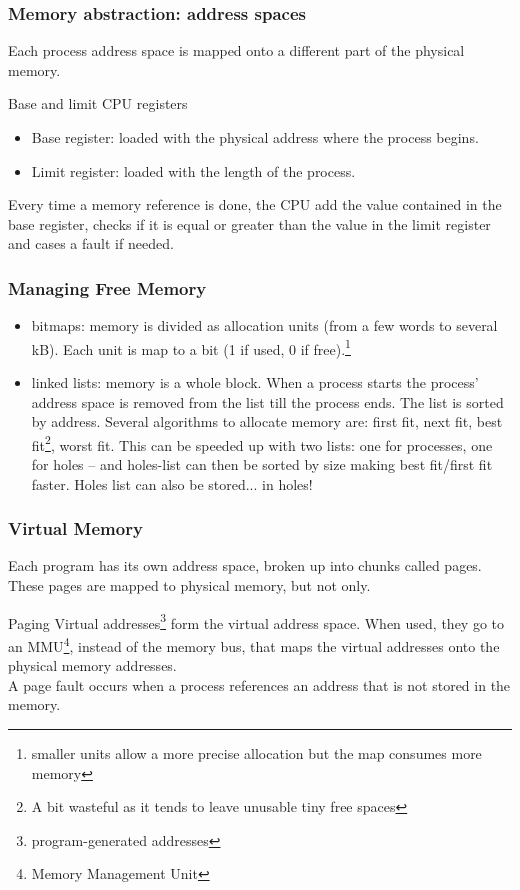   \begin{frame}
    \frametitle{Memory abstraction: address spaces}
    Each process address space is mapped onto a different part of the physical memory.
    \begin{block}{Base and limit CPU registers}
      \begin{itemize}
        \item Base register: loaded with the physical address where the process begins.
        \item Limit register: loaded with the length of the process.
      \end{itemize}
    \end{block}
    Every time a memory reference is done, the CPU add the value contained in the base register, checks if it is equal or greater than the value in the limit register and cases a fault if needed.
  \end{frame}

  \begin{frame}
    \frametitle{Managing Free Memory}
    \begin{itemize}
      \item bitmaps: memory is divided as allocation units (from a few words to several kB). Each unit is map to a bit (1 if used, 0 if free).\footnote{smaller units allow a more precise allocation but the map consumes more memory}
      \item linked lists: memory is a whole block. When a process starts the process' address space is removed from the list till the process ends. The list is sorted by address. Several algorithms to allocate memory are: first fit, next fit, best fit\footnote{A bit wasteful as it tends to leave unusable tiny free spaces}, worst fit. This can be speeded up with two lists: one for processes, one for holes -- and holes-list can then be sorted by size making best fit/first fit faster. Holes list can also be stored... in holes!
    \end{itemize}
  \end{frame}

  \begin{frame}
    \frametitle{Virtual Memory}
    Each program has its own address space, broken up into chunks called pages. These pages are mapped to physical memory, but not only.
    \begin{block}{Paging}
      Virtual addresses\footnote{program-generated addresses} form the virtual address space. When used, they go to an MMU\footnote{Memory Management Unit}, instead of the memory bus, that maps the virtual addresses onto the physical memory addresses.\\
      A page fault occurs when a process references an address that is not stored in the memory.
    \end{block}
  \end{frame}

